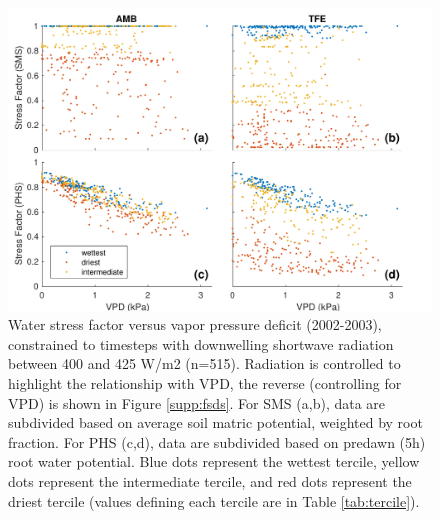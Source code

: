 \documentclass[draft,linenumbers]{agujournal}
\begin{document}
      \clearpage
    \begin{figure}[h]
     \centering
     \includegraphics[width=30pc]{../figs3/vpdstress.pdf}
     \caption{Water stress factor versus vapor pressure deficit (2002-2003), constrained to timesteps with downwelling shortwave radiation between 400 and 425 W/m2 (n=515).
     Radiation is controlled to highlight the relationship with VPD, the reverse (controlling for VPD) is shown in Figure \ref{supp:fsds}.
     For SMS (a,b), data are subdivided based on average soil matric potential, weighted by root fraction.
     For PHS (c,d), data are subdivided based on predawn (5h) root water potential.
     Blue dots represent the wettest tercile, yellow dots represent the intermediate tercile, and red dots represent the driest tercile (values defining each tercile are in Table \ref{tab:tercile}).
     }
     \label{fig:stress2}
       \end{figure}
      
\end{document}
